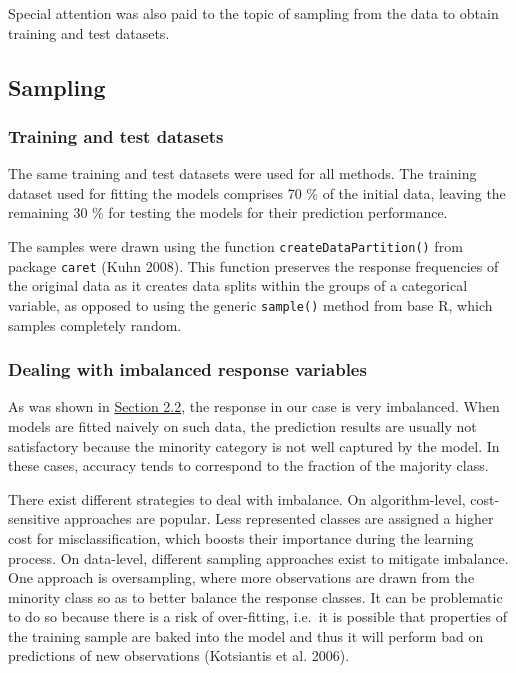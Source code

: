 \documentclass[11pt,]{article}
\begin{document}
Special attention was also paid to the topic of sampling from the data
to obtain training and test datasets.

\hypertarget{sampling}{%
\subsection{Sampling}\label{sampling}}

\hypertarget{training-and-test-datasets}{%
\subsubsection{Training and test
datasets}\label{training-and-test-datasets}}

The same training and test datasets were used for all methods. The
training dataset used for fitting the models comprises 70 \% of the
initial data, leaving the remaining 30 \% for testing the models for
their prediction performance.

The samples were drawn using the function \texttt{createDataPartition()}
from package \texttt{caret} (Kuhn 2008). This function preserves the
response frequencies of the original data as it creates data splits
within the groups of a categorical variable, as opposed to using the
generic \texttt{sample()} method from base R, which samples completely
random.

\hypertarget{dealing-with-imbalanced-response-variables}{%
\subsubsection{Dealing with imbalanced response
variables}\label{dealing-with-imbalanced-response-variables}}

As was shown in \protect\hyperlink{response}{Section 2.2}, the response
in our case is very imbalanced. When models are fitted naively on such
data, the prediction results are usually not satisfactory because the
minority category is not well captured by the model. In these cases,
accuracy tends to correspond to the fraction of the majority class.

There exist different strategies to deal with imbalance. On
algorithm-level, cost-sensitive approaches are popular. Less represented
classes are assigned a higher cost for misclassification, which boosts
their importance during the learning process. On data-level, different
sampling approaches exist to mitigate imbalance. One approach is
oversampling, where more observations are drawn from the minority class
so as to better balance the response classes. It can be problematic to
do so because there is a risk of over-fitting, i.e.~it is possible that
properties of the training sample are baked into the model and thus it
will perform bad on predictions of new observations (Kotsiantis et al.
2006).
\end{document}
